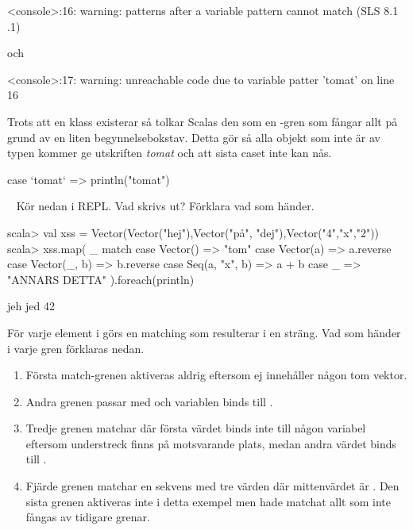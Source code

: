 \SubtaskSolved
\begin{REPL}
<console>:16: warning: patterns after a variable pattern cannot match (SLS 8.1
.1)
\end{REPL}
och
\begin{REPL}
<console>:17: warning: unreachable code due to variable patter 'tomat' on line
16
\end{REPL}
Trots att en klass  existerar så tolkar Scalas  den som en -gren som fångar allt på grund av en liten begynnelsebokstav. Detta gör så alla objekt som inte är av typen  kommer ge utskriften \textit{tomat} och att sista caset inte kan nås.

\SubtaskSolved
\begin{Code}
case `tomat` => println("tomat")
\end{Code}



\QUESTEND






\QUESTBEGIN

\Task \what ~ Kör nedan i REPL. Vad skrivs ut? Förklara vad som händer.
\begin{REPL}
scala> val xss = Vector(Vector("hej"),Vector("på", "dej"),Vector("4","x","2"))
scala> xss.map( _ match
  case Vector() => "tom"
  case Vector(a) => a.reverse
  case Vector(_, b) => b.reverse
  case Seq(a, "x", b) => a + b
  case _ => "ANNARS DETTA"
  ).foreach(println)
\end{REPL}


\SOLUTION

\TaskSolved \what

\begin{REPL}
jeh
jed
42
\end{REPL}
För varje element i  görs en matching som resulterar i en sträng. Vad som händer i varje gren förklaras nedan.
\begin{enumerate}
  \item Första match-grenen aktiveras aldrig eftersom  ej innehåller någon tom vektor.
  \item Andra grenen passar med  och variablen  binds till .
  \item Tredje grenen matchar  där första värdet binds inte till någon variabel eftersom understreck finns på motsvarande plats, medan andra värdet binds till .
  \item Fjärde grenen matchar en sekvens med tre värden där mittenvärdet är . Den sista grenen aktiveras inte i detta exempel men hade matchat allt som inte fångas av tidigare grenar.
\end{enumerate}

